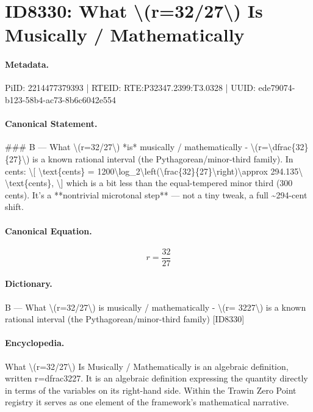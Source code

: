 \section*{ID8330: What \textbackslash{}(r=32/27\textbackslash{}) Is Musically / Mathematically}
\paragraph{Metadata.}
PiID: 2214477379393 | RTEID: RTE:P32347.2399:T3.0328 | UUID: ede79074-b123-58b4-ac73-8b6c6042e554

\paragraph{Canonical Statement.}
\#\#\# B — What \textbackslash{}(r=32/27\textbackslash{}) *is* musically / mathematically - \textbackslash{}(r=\textbackslash{}dfrac\{32\}\{27\}\textbackslash{}) is a known rational interval (the Pythagorean/minor-third family). In cents: \textbackslash{}[ \textbackslash{}text\{cents\} = 1200\textbackslash{}log\_2\textbackslash{}left(\textbackslash{}frac\{32\}\{27\}\textbackslash{}right)\textbackslash{}approx 294.135\textbackslash{} \textbackslash{}text\{cents\}, \textbackslash{}] which is a bit less than the equal-tempered minor third (300 cents). It’s a **nontrivial microtonal step** — not a tiny tweak, a full \textasciitilde{}294-cent shift.

\paragraph{Canonical Equation.}
\[
r=\dfrac{32}{27}
\]

\paragraph{Dictionary.}
B — What \textbackslash{}(r=32/27\textbackslash{}) is musically / mathematically - \textbackslash{}(r= 3227\textbackslash{}) is a known rational interval (the Pythagorean/minor-third family) [ID8330]

\paragraph{Encyclopedia.}
What \textbackslash{}(r=32/27\textbackslash{}) Is Musically / Mathematically is an algebraic definition, written r=dfrac3227. It is an algebraic definition expressing the quantity directly in terms of the variables on its right-hand side. Within the Trawin Zero Point registry it serves as one element of the framework's mathematical narrative.
